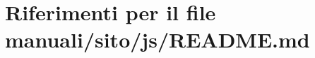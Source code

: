 \hypertarget{manuali_2sito_2js_2README_8md}{}\section{Riferimenti per il file manuali/sito/js/\+R\+E\+A\+D\+ME.md}
\label{manuali_2sito_2js_2README_8md}
